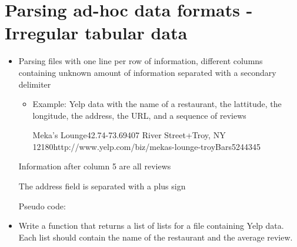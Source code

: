 \documentclass[letterpaper,10pt,english]{sphinxmanual}
\begin{document}
\section{Parsing ad-hoc data formats - Irregular tabular data}
\label{\detokenize{lecture_notes/lec13_files_web:parsing-ad-hoc-data-formats-irregular-tabular-data}}\begin{itemize}
\item {} 
Parsing files with one line per row of information, different
columns containing unknown amount of information separated with a
secondary delimiter
\begin{itemize}
\item {} 
Example: Yelp data with the name of a restaurant, the lattitude,
the longitude, the address, the URL, and a sequence of reviews

Meka’s Lounge\textbar{}42.74\textbar{}-73.69\textbar{}407 River Street+Troy, NY 12180\textbar{}http://www.yelp.com/biz/mekas-lounge-troy\textbar{}Bars\textbar{}5\textbar{}2\textbar{}4\textbar{}4\textbar{}3\textbar{}4\textbar{}5

\end{itemize}

Information after column 5 are all reviews

The address field is separated with a plus sign

Pseudo code:

%
\begin{sphinxVerbatim}[commandchars=\\\{\}]
     
       
         
         
         
\end{sphinxVerbatim}

\item {} 
 Write a function that returns a list of lists for a file
containing Yelp data.  Each list should contain the name of the
restaurant and the average review.

\end{itemize}
\end{document}
